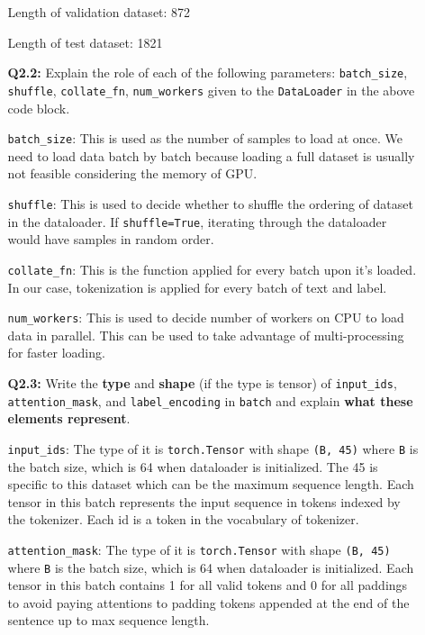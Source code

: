 \documentclass{article}
\newenvironment{solution}{\color{blue}}{}
\begin{document}
\begin{itemize}
\begin{itemize}
\begin{solution}
      Length of validation dataset: 872
      
      Length of test dataset: 1821
    \end{solution}
    
    \item[\textbf{Q2.2:}] Explain the role of each of the following parameters: \texttt{batch\_size}, 
    \texttt{shuffle}, \texttt{collate\_fn}, \texttt{num\_workers} given to the \texttt{DataLoader} in the above code block.

    \begin{solution}
      \texttt{batch\_size}: This is used as the number of samples to load at once. We need to load data batch by batch because loading a full dataset is usually not feasible considering the memory of GPU.

      \texttt{shuffle}: This is used to decide whether to shuffle the ordering of dataset in the dataloader. If \texttt{shuffle=True}, iterating through the dataloader would have samples in random order.

      \texttt{collate\_fn}: This is the function applied for every batch upon it's loaded. In our case, tokenization is applied for every batch of text and label.

      \texttt{num\_workers}: This is used to decide number of workers on CPU to load data in parallel. This can be used to take advantage of multi-processing for faster loading.
    \end{solution}
    
    \item[\textbf{Q2.3:}] Write the \textbf{type} and \textbf{shape} (if the type is tensor) of \texttt{input\_ids}, \texttt{attention\_mask}, and \texttt{label\_encoding} in \texttt{batch} and explain \textbf{what these elements represent}.
    
    \begin{solution}
      \texttt{input\_ids}: The type of it is \texttt{torch.Tensor} with shape \texttt{(B, 45)} where \texttt{B} is the batch size, which is 64 when dataloader is initialized. The 45 is specific to this dataset which can be the maximum sequence length. Each tensor in this batch represents the input sequence in tokens indexed by the tokenizer. Each id is a token in the vocabulary of tokenizer.

      \texttt{attention\_mask}: The type of it is \texttt{torch.Tensor} with shape \texttt{(B, 45)} where \texttt{B} is the batch size, which is 64 when dataloader is initialized. Each tensor in this batch contains 1 for all valid tokens and 0 for all paddings to avoid paying attentions to padding tokens appended at the end of the sentence up to max sequence length.


\end{solution}
\end{itemize}
\end{itemize}
\end{document}
